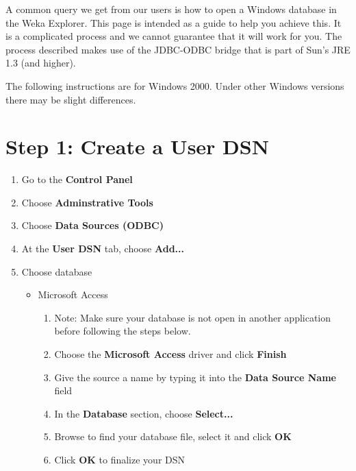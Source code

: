 
A common query we get from our users is how to open a Windows database in the Weka Explorer. This page is intended as a guide to help you achieve this. It is a complicated process and we cannot guarantee that it will work for you. The process described makes use of the JDBC-ODBC bridge that is part of Sun's JRE 1.3 (and higher).

The following instructions are for Windows 2000. Under other Windows versions there may be slight differences.

\section*{Step 1: Create a User DSN}
\begin{enumerate}
	\item Go to the \textbf{Control Panel}
	\item Choose \textbf{Adminstrative Tools}
	\item Choose \textbf{Data Sources (ODBC)}
	\item At the \textbf{User DSN} tab, choose \textbf{Add...}
	\item Choose database
	\begin{itemize}
		\item Microsoft Access
		\begin{enumerate}
			\item Note: Make sure your database is not open in another application before following the steps below.
			\item Choose the \textbf{Microsoft Access} driver and click \textbf{Finish}
			\item Give the source a name by typing it into the \textbf{Data Source Name} field
			\item In the \textbf{Database} section, choose \textbf{Select...}
			\item Browse to find your database file, select it and click \textbf{OK}
			\item Click \textbf{OK} to finalize your DSN
		\end{enumerate}


\end{itemize}
\end{enumerate}

